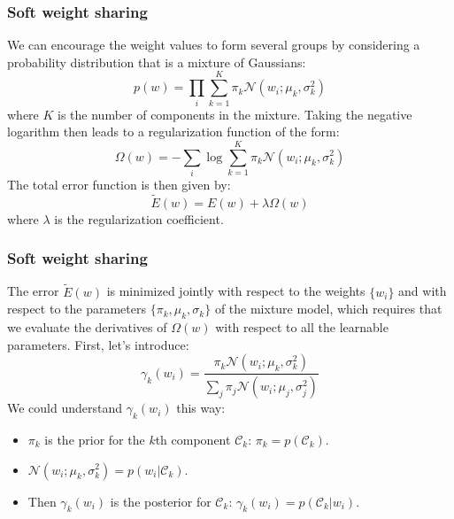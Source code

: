 \documentclass{beamer}
\begin{document}
\begin{frame}
    \frametitle{Soft weight sharing}
    We can encourage the weight values to form several groups by considering a probability distribution that is a mixture of Gaussians:
    \begin{equation*}
        p(w)=\prod_{i}\sum_{k=1}^{K}\pi_{k}\mathcal{N}(w_{i};\mu_{k},\sigma^{2}_{k})
    \end{equation*}
    where $K$ is the number of components in the mixture. Taking the negative logarithm then leads to a regularization function of the form:
    \begin{equation*}
        \Omega(w)=-\sum_{i}\log\sum_{k=1}^{K}\pi_{k}\mathcal{N}(w_{i};\mu_{k},\sigma^{2}_{k})
    \end{equation*}
    The total error function is then given by:
    \begin{equation*}
        \tilde{E}(w)=E(w)+\lambda\Omega(w)
    \end{equation*}
    where $\lambda$ is the regularization coefficient.
\end{frame}

\begin{frame}
    \frametitle{Soft weight sharing}
    The error $\tilde{E}(w)$ is minimized jointly with respect to the weights $\{w_{i}\}$ and with respect to the parameters $\{\pi_{k},\mu_{k},\sigma_{k}\}$ of the mixture model, which requires that we evaluate the derivatives of $\Omega(w)$ with respect to all the learnable parameters.
    \bigbreak
    First, let's introduce:
    \begin{equation*}
        \gamma_{k}(w_{i})=\frac{\pi_{k}\mathcal{N}(w_{i};\mu_{k},\sigma^{2}_{k})}{\sum_{j}\pi_{j}\mathcal{N}(w_{i};\mu_{j},\sigma^{2}_{j})}
    \end{equation*}
    We could understand $\gamma_{k}(w_{i})$ this way:
    \begin{itemize}
        \item $\pi_{k}$ is the prior for the $k$th component $\mathcal{C}_{k}$: $\pi_{k}=p(\mathcal{C}_{k})$.
        \item $\mathcal{N}(w_{i};\mu_{k},\sigma^{2}_{k})=p(w_{i}|\mathcal{C}_{k})$.
        \item Then $\gamma_{k}(w_{i})$ is the posterior for $\mathcal{C}_{k}$: $\gamma_{k}(w_{i})=p(\mathcal{C}_{k}|w_{i})$.
    \end{itemize}
\end{frame}
\end{document}
